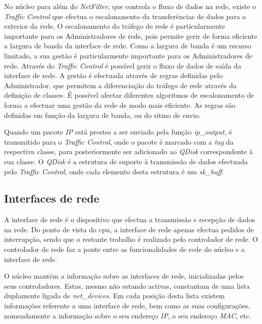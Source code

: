 
No núcleo para além do \textit{NetFilter}, que controla o fluxo de dados na rede, existe o \textit{Traffic Control} que efectua o escalonamento da transferências de dados para o exterior da rede.
O escalonamento do tráfego de rede é particularmente importante para os Administradores de rede, pois permite gerir de forma eficiente a largura de banda da interface de rede.
Como a largura de banda é um recurso limitado, a sua gestão é particularmente importante para os Administradores de rede.
Através do \textit{Traffic Control} é possível gerir o fluxo de dados de saída da interface de rede.
A gestão é efectuada através de regras definidas pelo Administrador, que permitem a diferenciação do tráfego de rede através da definição de classes.
É possível afectar diferentes algoritmos de escalonamento de forma a efectuar uma gestão da rede de modo mais eficiente.
As regras são definidas em função da largura de banda, ou do ritmo de envio.

Quando um pacote \textit{IP} está prestes a ser enviado pela função \textit{ip\_output}, é transmitido para o \textit{Traffic Control}, onde o pacote é marcado com a \textit{tag} da respectiva classe, para posteriormente ser adicionado ao \textit{QDisk} correspondente à sua classe.
O \textit{QDisk} é a estrutura de suporte à transmissão de dados efectuada pelo \textit{Traffic Control}, onde cada elemento desta estrutura é um \textit{sk\_buff}.


\subsection{Interfaces de rede}

A interface de rede é o dispositivo que efectua a transmissão e recepção de dados na rede.
Do ponto de vista do cpu, a interface de rede apenas efectua pedidos de interrupção, sendo que o restante trabalho é realizado pelo controlador de rede.
O controlador de rede faz a ponte entre as funcionalidades de rede do núcleo e a interface de rede.

O núcleo mantém a informação sobre as interfaces de rede, inicializadas pelos seus controladores.
Estas, mesmo não estando activas, constantam de uma lista duplamente ligada de \textit{net\_devices}.
Em cada posição desta lista existem informações referente a uma interface de rede, bem como as suas configurações, nomeadamente a informação sobre o seu endereço \textit{IP}, o seu endereço \textit{MAC}, etc.

